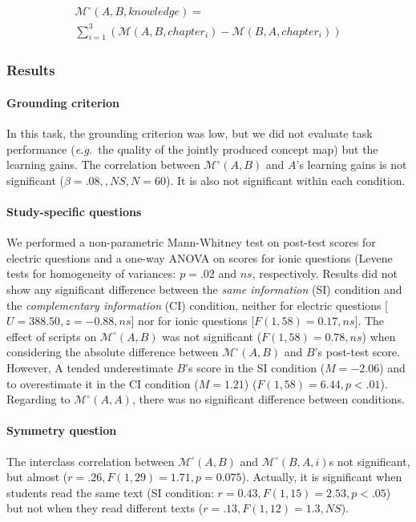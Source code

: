 \documentclass[twocolumn]{article}
\newcommand{\eg}{{\textit{e.g.\ }}}
\newcommand{\M}[3]{{\mathcal{M}(#1, #2, #3)}}
\newcommand{\Model}[3]{{$\mathcal{M}^{\circ}(#1, #2, #3)$}}
\newcommand{\gModel}[2]{{$\mathcal{M}^{\circ}(#1, #2)$}}
\newcommand{\Mdeg}[3]{{\mathcal{M}^{\circ}(#1, #2, #3)}}
\begin{document}
\begin{multline} \label{eq:study4.3}
    \Mdeg{A}{B}{knowledge} = \\
        \sum_{i=1}^{3}  (\M{A}{B}{chapter_i} - \M{B}{A}{chapter_i})
\end{multline}

\subsubsection*{Results}

\paragraph{Grounding criterion} In this task, the grounding criterion was low,
but we did not evaluate task performance (\eg the quality of the jointly
produced concept map) but the learning gains. The correlation between
\gModel{A}{B} and $A$'s learning gains is not significant ($\beta =.08, ,NS, N =
60$). It is also not significant within each condition.

\paragraph{Study-specific questions} We performed a non-parametric Mann-Whitney
test on post-test scores for electric questions and a one-way ANOVA on scores
for ionic questions (Levene tests for homogeneity of variances: $p = .02$ and
$ns$, respectively. Results  did not show any significant difference between the
\emph{same information} (SI) condition and the \emph{complementary information}
(CI) condition, neither for electric questions [$U = 388.50, z = -0.88, ns$] nor
for ionic questions [$F(1, 58) = 0.17, ns$].  The effect of scripts on
\gModel{A}{B} was not significant ($F(1, 58) = 0.78, ns$) when considering the
absolute difference between \gModel{A}{B} and $B$'s post-test score. However, A
tended underestimate $B$'s score in the SI condition ($M = -2.06$) and to
overestimate it in the CI condition ($M = 1.21$) ($F(1, 58) = 6.44, p<.01$).
Regarding to \gModel{A}{A}, there was no significant difference between
conditions.

\paragraph{Symmetry question} The interclass correlation between \gModel{A}{B}
and \Model{B}{A} is not significant, but almost ($r=.26, F(1,29)=1.71, p=
0.075$).  Actually, it is significant when students read the same text (SI
condition: $r=0.43, F(1,15)=2.53, p<.05$) but not when they read different texts
($r=.13, F(1,12)=1.3, NS$). 
\end{document}

